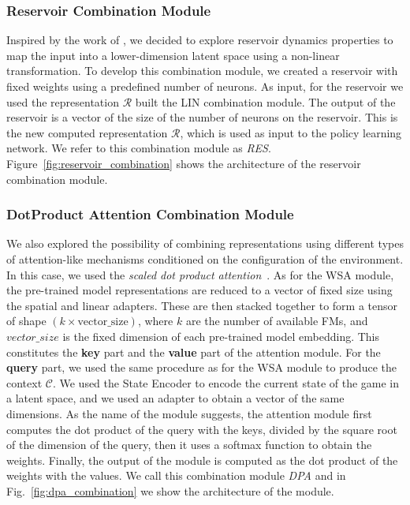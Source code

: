 \subsubsection{Reservoir Combination Module}
\label{subsubsec:reservoir_combination}
Inspired by the work of \citet{gallicchio2017}, we decided to explore reservoir dynamics properties to map the input into a lower-dimension latent space using a non-linear transformation.
To develop this combination module, we created a reservoir with fixed weights using a predefined number of neurons.
As input, for the reservoir we used the representation $\mathcal{R}$ built the LIN combination module.
The output of the reservoir is a vector of the size of the number of neurons on the reservoir.
This is the new computed representation $\mathcal{R}$, which is used as input to the policy learning network.
We refer to this combination module as \textit{RES}.
Figure~\ref{fig:reservoir_combination} shows the architecture of the reservoir combination module.

\subsubsection{DotProduct Attention Combination Module}
\label{subsubsec:dpa}

We also explored the possibility of combining representations using different types of attention-like mechanisms conditioned on the configuration of the environment.
In this case, we used the \textit{scaled dot product attention}~\citep{vaswani2017attention}.
As for the WSA module, the pre-trained model representations are reduced to a vector of fixed size using the spatial and linear adapters.
These are then stacked together to form a tensor of shape $(k \times \text{vector\_size})$, where $k$ are the number of available FMs, and $vector\_size$ is the fixed dimension of each pre-trained model embedding.
This constitutes the \textbf{key} part and the \textbf{value} part of the attention module.
For the \textbf{query} part, we used the same procedure as for the WSA module to produce the context $\mathcal{C}$.
We used the State Encoder to encode the current state of the game in a latent space, and we used an adapter to obtain a vector of the same dimensions.
As the name of the module suggests, the attention module first computes the dot product of the query with the keys, divided by the square root of the dimension of the query, then it uses a softmax function to obtain the weights.
Finally, the output of the module is computed as the dot product of the weights with the values.
We call this combination module \textit{DPA} and in Fig.~\ref{fig:dpa_combination} we show the architecture of the module.


